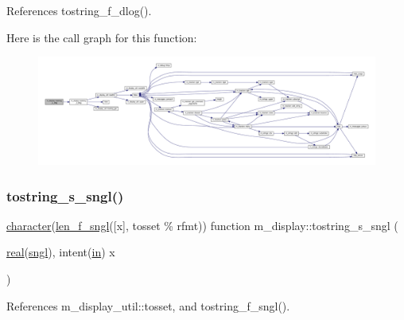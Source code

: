 References tostring\+\_\+f\+\_\+dlog().

Here is the call graph for this function\+:
\nopagebreak
\begin{figure}[H]
\begin{center}
\leavevmode
\includegraphics[width=350pt]{namespacem__display_a75e826c601efdb91148684ebaf34788b_cgraph}
\end{center}
\end{figure}
\mbox{\label{namespacem__display_a05b3cac8d4c04e08dc99c7c23f1254ba}} 
\subsubsection{\texorpdfstring{tostring\+\_\+s\+\_\+sngl()}{tostring\_s\_sngl()}}
{\footnotesize\ttfamily \hyperlink{option__stopwatch_83_8txt_abd4b21fbbd175834027b5224bfe97e66}{character}(\hyperlink{namespacem__display_ae0feb946fbc4c31f8ba53e20719fa508}{len\+\_\+f\+\_\+sngl}(\mbox{[}x\mbox{]}, tosset \% rfmt)) function m\+\_\+display\+::tostring\+\_\+s\+\_\+sngl (\begin{DoxyParamCaption}\item[{\hyperlink{read__watch_83_8txt_abdb62bde002f38ef75f810d3a905a823}{real}(\hyperlink{namespacem__display_a2ac86bc535c3ccc5947dbb3109c666b5}{sngl}), intent(\hyperlink{M__journal_83_8txt_afce72651d1eed785a2132bee863b2f38}{in})}]{x }\end{DoxyParamCaption})\hspace{0.3cm}{\ttfamily [private]}}



References m\+\_\+display\+\_\+util\+::tosset, and tostring\+\_\+f\+\_\+sngl().

